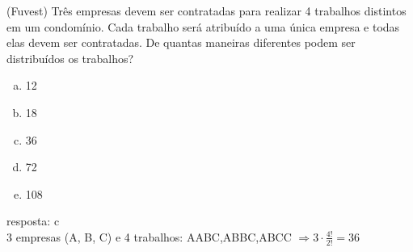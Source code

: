 \begin{ex}
(Fuvest) Três empresas devem ser contratadas para realizar 4 trabalhos distintos em um condomínio. Cada trabalho será atribuído a uma única empresa e todas elas devem ser contratadas. De quantas maneiras diferentes podem ser distribuídos os trabalhos?
   \begin{enumerate}[(a)]
   \item 12
   \item 18
   \item 36
   \item 72
   \item 108
   \end{enumerate}
     \begin{sol}
       resposta: c \\
       3 empresas (A, B, C) e 4 trabalhos: AABC,ABBC,ABCC $\Longrightarrow 3\cdot\frac{4!}{2!}=$36
     \end{sol}
\end{ex}